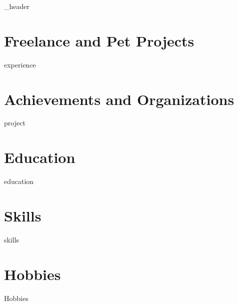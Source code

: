 \documentclass[letter,10pt]{article}
\author{Mohammad Abir Abbas}
\begin{document}
{_header}
\vspace*{10pt}


\section{Freelance and Pet Projects}
{experience}
\vspace*{10pt}

\section{Achievements and Organizations}
{project}
\vspace*{10pt}

\section{Education}
{education}
\vspace*{10pt}

\section{Skills}
\vspace*{3pt}
{skills}
\vspace*{10pt}

\section{Hobbies}
\vspace*{3pt}
{Hobbies}
\vspace*{10pt}
\end{document}
